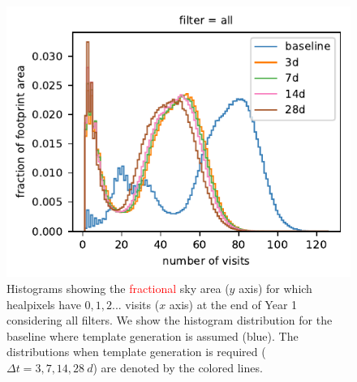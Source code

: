 \documentclass[preprintm,linenumbers]{aastex631}
\providecommand{\red}[1]{\textcolor{red}{#1}}
\begin{document}
		\begin{figure}
			\centering
			
			\includegraphics{results/histograms/hist_first_year_one_snap_v4_0_10yrs_db_noDD_noTwi_CountMetric_doAllTemplateMetrics_reduceCount_all_noDD_noTwi.pdf}
			
			\caption{
				Histograms showing the \red{fractional} sky area ($y$ axis) for which healpixels have $0, 1, 2...$ visits ($x$ axis) at the end of Year 1 considering all filters.
				We show the histogram distribution for the baseline where template generation is assumed (blue).
				The distributions when template generation is required ($\Delta t = 3, 7, 14, 28\ \si{d}$) are denoted by the colored lines.
			\label{fig:template_baseline_all}}
		\end{figure}
		
\end{document}

